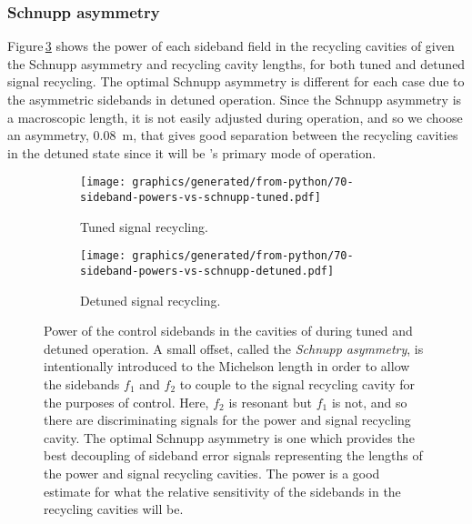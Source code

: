 \subsubsection{Schnupp asymmetry}
Figure\,\ref{fig:sideband-powers-vs-schnupp} shows the power of each sideband field in the recycling cavities of \ETLF{} given the Schnupp asymmetry and recycling cavity lengths, for both tuned and detuned signal recycling. The optimal Schnupp asymmetry is different for each case due to the asymmetric sidebands in detuned operation. Since the Schnupp asymmetry is a macroscopic length, it is not easily adjusted during operation, and so we choose an asymmetry, \SI{0.08}{\meter}, that gives good separation between the recycling cavities in the detuned state since it will be \ETLF{}'s primary mode of operation.

\begin{figure}
  \centering
  \begin{subfigure}{.49\textwidth}
    \texttt{[image: graphics/generated/from-python/70-sideband-powers-vs-schnupp-tuned.pdf]}
    \caption[Power of the control sidebands in the cavities of \ETLF{} with tuned signal recycling]{\label{fig:sideband-powers-vs-schnupp-tuned}Tuned signal recycling.}
  \end{subfigure}
  \hfill
  \begin{subfigure}{.49\textwidth}
    \texttt{[image: graphics/generated/from-python/70-sideband-powers-vs-schnupp-detuned.pdf]}
    \caption[Power of the control sidebands in the cavities of \ETLF{} with tuned signal recycling]{\label{fig:sideband-powers-vs-schnupp-detuned}Detuned signal recycling.}
  \end{subfigure}
  \caption[Power of the control sidebands in the cavities of \ETLF{}]{\label{fig:sideband-powers-vs-schnupp}Power of the control sidebands in the cavities of \ETLF{} during tuned and detuned operation. A small offset, called the \emph{Schnupp asymmetry}, is intentionally introduced to the Michelson length in order to allow the sidebands $f_1$ and $f_2$ to couple to the signal recycling cavity for the purposes of control. Here, $f_2$ is resonant but $f_1$ is not, and so there are discriminating signals for the power and signal recycling cavity. The optimal Schnupp asymmetry is one which provides the best decoupling of sideband error signals representing the lengths of the power and signal recycling cavities. The power is a good estimate for what the relative sensitivity of the sidebands in the recycling cavities will be.}
\end{figure}


